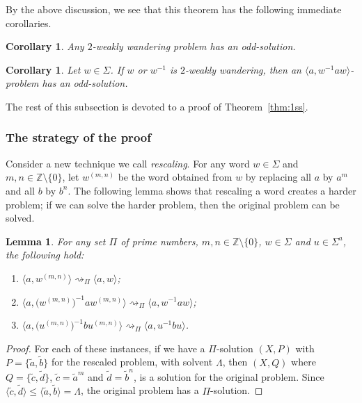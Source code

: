 \documentclass[11pt]{amsart}
\newtheorem{corollary}[theorem]{Corollary}
\newtheorem{lemma}[theorem]{Lemma}
\theoremstyle{definition}
\theoremstyle{definition}
\numberwithin{equation}{section}
\begin{document}
By the above discussion, we see that this theorem has the following immediate corollaries.

\begin{corollary} Any $2$-weakly wandering problem has an odd-solution.
\end{corollary}

\begin{corollary} Let $w\in \Sigma$. If $w$ or $w^{-1}$ is $2$-weakly wandering, then an $\langle a, w^{-1}aw\rangle$-problem has an odd-solution.
\end{corollary}

The rest of this subsection is devoted to a proof of Theorem~\ref{thm:1ss}. 


\subsubsection{The strategy of the proof}

Consider a new technique we call {\em rescaling}. For any word $w\in \Sigma$ and $m,n\in\mathbb{Z}\setminus\{0\}$, let $w^{(m,n)}$ be the word obtained from $w$ by replacing all $a$ by $a^m$ and all $b$ by $b^n$. The following lemma shows that rescaling a word creates a harder problem; if we can solve the harder problem, then the original problem can be solved.

\begin{lemma}\label{lem:rescaling} For any set $\Pi$ of prime numbers, $m, n\in\mathbb{Z}\setminus\{0\}$, $w\in \Sigma$ and $u\in \Sigma^a$, the following hold:
\begin{enumerate}
\item[\rm (i)] $\big\langle a, w^{(m,n)}\big\rangle\rightsquigarrow_\Pi\langle a, w\rangle$;
\item[\rm (ii)] $\big\langle a, \big(w^{(m,n)}\big)^{-1}aw^{(m,n)}\big\rangle\rightsquigarrow_{\Pi}\langle a, w^{-1}aw\rangle$;
\item[\rm (iii)] $\big\langle a, \big(u^{(m,n)}\big)^{-1}bu^{(m,n)}\big\rangle\rightsquigarrow_{\Pi}\langle a, u^{-1}bu\rangle$.
\end{enumerate}
\end{lemma}

\begin{proof} For each of these instances, if we have a $\Pi$-solution $(X, P)$ with $P=\{\tilde{a}, \tilde{b}\}$ for the rescaled problem, with solvent $\Lambda$, then $(X, Q)$ where $Q=\{\tilde{c}, \tilde{d}\}$, $\tilde{c}=\tilde{a}^m$ and $\tilde{d}=\tilde{b}^n$, is a solution for the original problem. Since $\langle \tilde{c}, \tilde{d}\rangle\leq \langle \tilde{a}, \tilde{b}\rangle=\Lambda$, the original problem has a $\Pi$-solution.
\end{proof}
\end{document}
